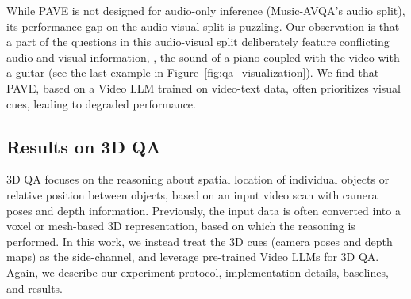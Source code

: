 While PAVE is not designed for audio-only inference (Music-AVQA's audio split), its performance gap on the audio-visual split is puzzling. Our observation is that a part of the questions in this audio-visual split deliberately feature conflicting audio and visual information, \eg, the sound of a piano coupled with the video with a guitar (see the last example in Figure~\ref{fig:qa_visualization}). We find that PAVE, based on a Video LLM trained on video-text data, often prioritizes visual cues, leading to degraded performance.



\subsection{Results on 3D QA} \label{section_res_3d}
3D QA focuses on the reasoning about spatial location of individual objects or relative position between objects, based on an input video scan with camera poses and depth information. Previously, the input data is often converted into a voxel or mesh-based 3D representation, based on which the reasoning is performed. In this work, we instead treat the 3D cues (camera poses and depth maps) as the side-channel, and leverage pre-trained Video LLMs for 3D QA. Again, we describe our experiment protocol, implementation details, baselines, and results. 


